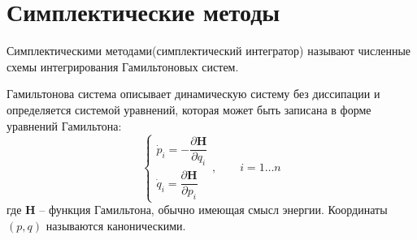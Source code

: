 \section{Симплектические методы}
Симплектическими методами(симплектический интегратор)
называют численные схемы интегрирования Гамильтоновых систем.

Гамильтонова система описывает динамическую систему без диссипации и
определяется системой уравнений, которая может быть записана в форме уравнений
Гамильтона:
\begin{equation}
    \begin{cases}
        \dot p_i = -\dfrac{\partial \mathbf H}{\partial q_i}\\
        \dot q_i = \dfrac{\partial \mathbf H}{\partial p_i}
    \end{cases},
    \qquad i = 1\dots n
\end{equation}
где $\mathbf H$ -- функция Гамильтона, обычно имеющая смысл энергии. Координаты
$(p, q)$ называются каноническими.

